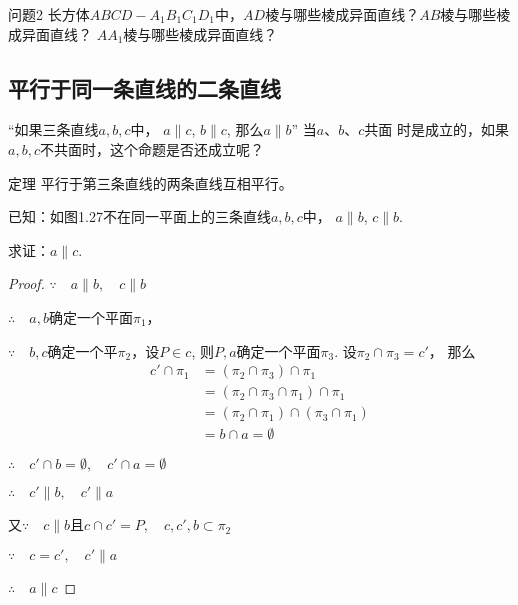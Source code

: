 \begin{blk}{问题2}
  长方体$ABCD-A_1B_1C_1D_1$中，$AD$棱与哪些棱成异面直线？$AB$棱与哪些棱成异面直线？
$AA_1$棱与哪些棱成异面直线？
\end{blk}

\subsection{平行于同一条直线的二条直线}
“如果三条直线$a,b,c$中，
$a\parallel c$, $b\parallel c$, 那么$a\parallel b$” 当$a$、$b$、$c$共面
时是成立的，如果$a,b,c$不共面时，这个命题是否还成立呢？

\begin{blk}
  {定理} 平行于第三条直线的两条直线互相平行。
\end{blk}

已知：如图1.27不在同一平面上的三条直线$a,b,c$中，
$a\parallel b$, $c\parallel b$. 

求证：$a\parallel c$.

\begin{figure}[htp]
  \centering
{}
  \caption{}
\end{figure}


\begin{proof}
  $\because\quad a\parallel b,\quad c\parallel b$

  $\therefore\quad a,b$确定一个平面$\pi_1$，

  $\because\quad b,c$确定一个平$\pi_2$，设$P\in c$, 则$P,a$确定一个平面$\pi_3$. 设$\pi_2\cap \pi_3=c'$，
  那么
\[\begin{split}
  c'\cap \pi_1&=(\pi_2\cap \pi_3)\cap \pi_1\\
  &=(\pi_2\cap \pi_3\cap \pi_1)\cap \pi_1\\
  &=(\pi_2\cap \pi_1)\cap (\pi_3\cap \pi_1)\\
  &=b\cap a=\emptyset
\end{split}\]

$\therefore\quad c'\cap b=\emptyset,\quad c'\cap a=\emptyset$

$\therefore\quad c'\parallel b,\quad c'\parallel a$

又$\because\quad c\parallel b$且$c\cap c'=P,\quad c,c',b\subset \pi_2$

$\because\quad c=c',\quad c'\parallel a$

$\therefore\quad a\parallel c$
\end{proof}

